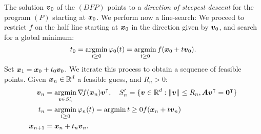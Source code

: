 The solution $\boldsymbol{v}_0$ of the $(DFP)$ points to a \emph{direction of steepest descent} for the program $(P)$ starting at $\boldsymbol{x}_0$.  We perform now a line-search: We proceed to restrict $f$ on the half line starting at $\boldsymbol{x}_0$ in the direction given by $\boldsymbol{v}_0$, and search for a global minimum:
\begin{equation*}
t_0 = \operatorname*{argmin}_{t \geq 0} \varphi_0(t) = \operatorname*{argmin}_{t \geq 0} f(\boldsymbol{x}_0 + t\boldsymbol{v}_0).
\end{equation*}
Set $\boldsymbol{x}_1 = \boldsymbol{x}_0 + t_0\boldsymbol{v}_0$.  We iterate this process to obtain a sequence of feasible points.  Given $\boldsymbol{x}_n \in \mathbb{R}^d$ a feasible guess, and $R_n > 0$:
\begin{align*}
\boldsymbol{v}_n &= \operatorname*{argmin}_{\boldsymbol{v} \in S_n'} \mathop{\nabla\! {f}}(\boldsymbol{x}_n){\boldsymbol{v}}^\intercal, \quad S_n' = \{ \boldsymbol{v} \in \mathbb{R}^d : \lVert \boldsymbol{v} \rVert \leq R_n, \boldsymbol{A}{\boldsymbol{v}}^\intercal={\boldsymbol{0}}^\intercal\} \\
t_n &= \operatorname*{argmin}_{t \geq 0} \varphi_n(t) = \operatorname*{argmin}{t \geq 0} f(\boldsymbol{x}_n + t \boldsymbol{v}_n) \\
\boldsymbol{x}_{n+1} &= \boldsymbol{x}_n + t_n \boldsymbol{v}_n.
\end{align*}

